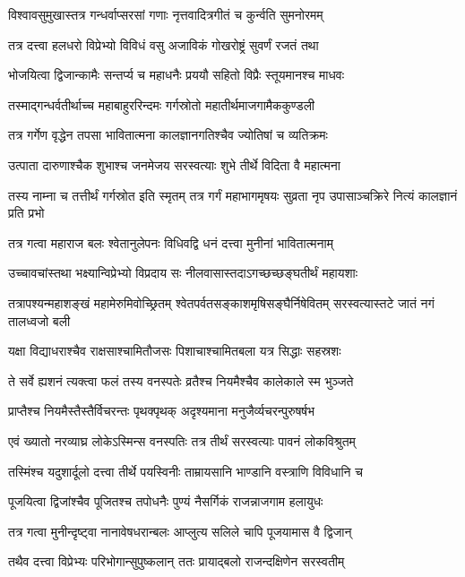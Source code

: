 \twolineshloka
{विश्वावसुमुखास्तत्र गन्धर्वाप्सरसां गणाः}
{नृत्तवादित्रगीतं च कुर्न्वति सुमनोरमम्}


\twolineshloka
{तत्र दत्त्वा हलधरो विप्रेभ्यो विविधं वसु}
{अजाविकं गोखरोष्ट्रं सुवर्णं रजतं तथा}


\twolineshloka
{भोजयित्वा द्विजान्कामैः सन्तर्प्य च महाधनैः}
{प्रययौ सहितो विप्रैः स्तूयमानश्च माधवः}


\twolineshloka
{तस्माद्गन्धर्वतीर्थाच्च महाबाहुररिन्दमः}
{गर्गस्रोतो महातीर्थमाजगामैककुण्डली}


\twolineshloka
{तत्र गर्गेण वृद्धेन तपसा भावितात्मना}
{कालज्ञानगतिश्चैव ज्योतिषां च व्यतिक्रमः}


\twolineshloka
{उत्पाता दारुणाश्चैक शुभाश्च जनमेजय}
{सरस्वत्याः शुभे तीर्थे विदिता वै महात्मना}


तस्य नाम्ना च तत्तीर्थं गर्गस्रोत इति स्मृतम्
\twolineshloka
{तत्र गर्गं महाभागमृषयः सुव्रता नृप}
{उपासाञ्चक्रिरे नित्यं कालज्ञानं प्रति प्रभो}


\twolineshloka
{तत्र गत्वा महाराज बलः श्वेतानुलेपनः}
{विधिवद्वि धनं दत्त्वा मुनीनां भावितात्मनाम्}


\twolineshloka
{उच्चावचांस्तथा भक्ष्यान्विप्रेभ्यो विप्रदाय सः}
{नीलवासास्तदाऽगच्छच्छङ्घतीर्थं महायशाः}


\threelineshloka
{तत्रापश्यन्महाशङ्खं महामेरुमिवोच्छ्रितम्}
{श्वेतपर्वतसङ्काशमृषिसङ्घैर्निषेवितम्}
{सरस्वत्यास्तटे जातं नगं तालध्वजो बली}


\twolineshloka
{यक्षा विद्याधराश्चैव राक्षसाश्चामितौजसः}
{पिशाचाश्चामितबला यत्र सिद्धाः सहस्रशः}


\twolineshloka
{ते सर्वे ह्यशनं त्यक्त्वा फलं तस्य वनस्पतेः}
{व्रतैश्च नियमैश्चैव कालेकाले स्म भुञ्जते}


\twolineshloka
{प्राप्तैश्च नियमैस्तैस्तैर्विचरन्तः पृथक्पृथक्}
{अदृश्यमाना मनुजैर्व्यचरन्पुरुषर्षभ}


\twolineshloka
{एवं ख्यातो नरव्याघ्र लोकेऽस्मिन्स वनस्पतिः}
{तत्र तीर्थं सरस्वत्याः पावनं लोकविश्रुतम्}


\twolineshloka
{तस्मिंश्च यदुशार्दूलो दत्त्वा तीर्थे पयस्विनीः}
{ताम्रायसानि भाण्डानि वस्त्राणि विविधानि च}


\twolineshloka
{पूजयित्वा द्विजांश्चैव पूजितश्च तपोधनैः}
{पुण्यं नैसर्गिकं राजन्नाजगाम हलायुधः}


\twolineshloka
{तत्र गत्वा मुनीन्दृष्ट्वा नानावेषधरान्बलः}
{आप्लुत्य सलिले चापि पूजयामास वै द्विजान्}


\twolineshloka
{तथैव दत्त्वा विप्रेभ्यः परिभोगान्सुपुष्कलान्}
{ततः प्रायाद्बलो राजन्दक्षिणेन सरस्वतीम्}


